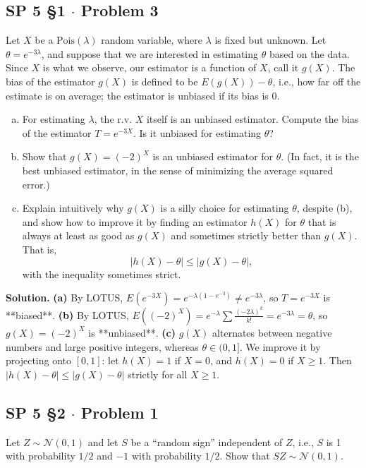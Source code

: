 \documentclass[11pt,a4paper]{article}
\begin{document}
\subsection{SP 5 \S1 $\cdot$ Problem 3}
\begin{tcolorbox}[title={SP 5 \S1 $\cdot$ Problem 3}]
Let $X$ be a $\text{Pois}(\lambda)$ random variable, where $\lambda$ is fixed but unknown. Let $\theta = e^{-3\lambda}$, and suppose that we are interested in estimating $\theta$ based on the data. Since $X$ is what we observe, our estimator is a function of $X$, call it $g(X)$. The bias of the estimator $g(X)$ is defined to be $E(g(X)) - \theta$, i.e., how far off the estimate is on average; the estimator is unbiased if its bias is 0.
\begin{enumerate}[(a)]
\item For estimating $\lambda$, the r.v. $X$ itself is an unbiased estimator. Compute the bias of the estimator $T = e^{-3X}$. Is it unbiased for estimating $\theta$?
\item Show that $g(X) = (-2)^X$ is an unbiased estimator for $\theta$. (In fact, it is the best unbiased estimator, in the sense of minimizing the average squared error.)
\item Explain intuitively why $g(X)$ is a silly choice for estimating $\theta$, despite (b), and show how to improve it by finding an estimator $h(X)$ for $\theta$ that is always at least as good as $g(X)$ and sometimes strictly better than $g(X)$. That is,
\[
|h(X) - \theta| \le |g(X) - \theta|,
\]
with the inequality sometimes strict.
\end{enumerate}
\end{tcolorbox}

\noindent \textbf{Solution.} \textbf{(a)} By LOTUS, $E(e^{-3X}) = e^{-\lambda(1 - e^{-3})} \neq e^{-3\lambda}$, so $T = e^{-3X}$ is **biased**.
\textbf{(b)} By LOTUS, $E((-2)^X) = e^{-\lambda} \sum \frac{(-2\lambda)^k}{k!} = e^{-3\lambda} = \theta$, so $g(X) = (-2)^X$ is **unbiased**.
\textbf{(c)} $g(X)$ alternates between negative numbers and large positive integers, whereas $\theta \in (0, 1]$. We improve it by projecting onto $[0, 1]$: let $h(X) = 1$ if $X = 0$, and $h(X) = 0$ if $X \ge 1$. Then $|h(X) - \theta| \le |g(X) - \theta|$ strictly for all $X \ge 1$.

\vspace{10pt}
\subsection{SP 5 \S2 $\cdot$ Problem 1}
\begin{tcolorbox}[title={SP 5 \S2 $\cdot$ Problem 1}]
Let $Z \sim \mathcal{N}(0, 1)$ and let $S$ be a ``random sign'' independent of $Z$, i.e., $S$ is 1 with probability $1/2$ and $-1$ with probability $1/2$. Show that $SZ \sim \mathcal{N}(0, 1)$.
\end{tcolorbox}
\end{document}
